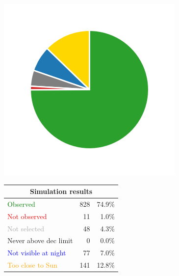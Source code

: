 \begin{colsection}
\begin{figure}[p]
    \begin{center}
        \begin{minipage}[t]{0.15\linewidth}\vspace{0.6cm}
            \includegraphics[trim={.5cm 0 .5cm 0},clip,width=\linewidth]{images/gw_sims/2n8+2k8_pie.png}
        \end{minipage}
        \begin{minipage}[t]{0.45\linewidth}\vspace{0pt}
            \begin{tabular}{lrr}
                \multicolumn{3}{c}{\textbf{Simulation results}} \\
                \midrule
                \textcolor{Green}{Observed} & 828 & 74.9\% \\
                \textcolor{Red}{Not observed} & 11 & 1.0\% \\
                \textcolor{darkgray}{Not selected} & 48 & 4.3\% \\
                \textcolor{NavyBlue}{Never above dec limit} & 0 & 0.0\% \\
                \textcolor{Blue}{Not visible at night} & 77 & 7.0\% \\
                \textcolor{Orange}{Too close to Sun} & 141 & 12.8\% \\

\end{tabular}
\end{minipage}
\end{center}
\end{figure}
\end{colsection}
